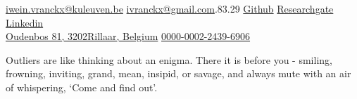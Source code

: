 \documentclass[10pt,a4paper]{article}
\begin{document}
\sloppy  %

%

\nobreakvspace{0.3em}  %

\noindent\href{mailto:iwein.vranckx@kuleuven.be}{iwein.vranckx\mbox{}@\mbox{}kuleuven.be}\sbull
\noindent\href{mailto:ivranckx@gmail.com}{ivranckx\mbox{}@\mbox{}gmail.com}.83.29\sbull
\href{https://github.com/ivranckx}{Github}\sbull
\href{https://www.researchgate.net/profile/Iwein_Vranckx}{Researchgate}\sbull
\href{http://linkedin.com/in/ivranckx}{Linkedin}
\\
\href{https://www.google.com/maps/place/3202+Rillaar}{Oudenbos  81, 
3202\thinspace Rillaar, Belgium}\sbull%
\href{https://orcid.org/0000-0002-2439-6906}{\textcolor{orcidlogocol}{\aiOrcid} \hspace{0.2mm} 0000-0002-2439-6906}
\spacedhrule{0.9em}{-0.4em}  %
\begin{fquote}
	\large	Outliers are like thinking about an enigma. There it is before you - smiling, frowning, inviting, grand, mean, insipid, or savage, and always mute with an air of whispering, ‘Come and find out'.
\end{fquote}
\end{document}
